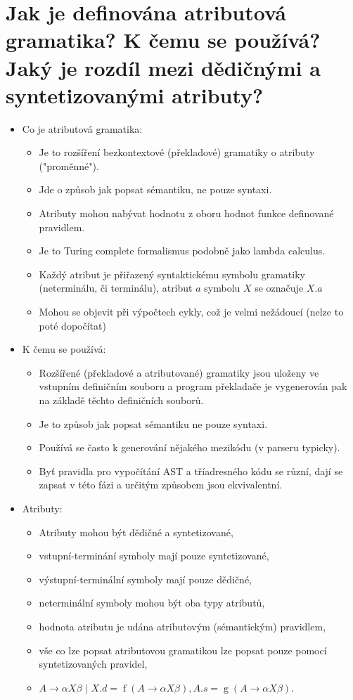 \documentclass{article}
\begin{document}
\section{Jak je definována atributová gramatika? K čemu se používá? Jaký je rozdíl mezi dědičnými a syntetizovanými atributy?}
\begin{itemize}
  \item Co je atributová gramatika:
  \begin{itemize}
      \item Je to rozšíření bezkontextové (překladové) gramatiky o atributy ("proměnné").
      \item Jde o způsob jak popsat sémantiku, ne pouze syntaxi.
      \item Atributy mohou nabývat hodnotu z oboru hodnot funkce definované pravidlem.
      \item Je to Turing complete formalismus podobně jako lambda calculus.
      \item Každý atribut je přiřazený syntaktickému symbolu gramatiky (neterminálu, či terminálu), atribut $a$ symbolu $X$ se označuje $X.a$
      \item Mohou se objevit při výpočtech cykly, což je velmi nežádoucí (nelze to poté dopočítat)
  \end{itemize}
  \item K čemu se používá:
  \begin{itemize}
      \item Rozšířené (překladové a atributované) gramatiky jsou uloženy ve vstupním definičním souboru a program překladače je vygenerován pak na základě těchto definičních souborů.
      \item Je to způsob jak popsat sémantiku ne pouze syntaxi.
      \item Používá se často k generování nějakého mezikódu (v parseru typicky).
      \item Byť pravidla pro vypočítání AST a tříadresného kódu se různí, dají se zapsat v této fázi 
      a určitým způsobem jsou ekvivalentní.
  \end{itemize}
  \item Atributy:
  \begin{itemize}
      \item Atributy mohou být dědičné a syntetizované,
      \item vstupní-terminání symboly mají pouze syntetizované,
      \item výstupní-terminální symboly mají pouze dědičné,
      \item neterminální symboly mohou být oba typy atributů,
      \item hodnota atributu je udána atributovým (sémantickým) pravidlem,
      \item vše co lze popsat atributovou gramatikou lze popsat pouze pomocí syntetizovaných pravidel,
      \item $A \rightarrow \alpha X \beta$  $|$  $X.d = \operatorname {f}(A \rightarrow \alpha X \beta), A.s = \operatorname{g}(A \rightarrow \alpha X \beta)$.
  \end{itemize}
\end{itemize}
\newpage
\end{document}
